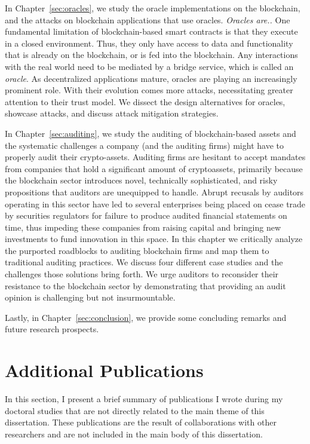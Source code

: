 In Chapter~\ref{sec:oracles}, we study the oracle implementations on the blockchain, and the attacks on blockchain applications that use oracles. \textit{Oracles are.. } One fundamental limitation of blockchain-based smart contracts is that they execute in a closed environment. Thus, they only have access to data and functionality that is already on the blockchain, or is fed into the blockchain. Any interactions with the real world need to be mediated by a bridge service, which is called an \textit{oracle}. As decentralized applications mature, oracles are playing an increasingly prominent role. With their evolution comes more attacks, necessitating greater attention to their trust model. We dissect the design alternatives for oracles, showcase attacks, and discuss attack mitigation strategies.


In Chapter~\ref{sec:auditing}, we study the auditing of blockchain-based assets and the systematic challenges a company (and the auditing firms) might have to properly audit their crypto-assets. Auditing firms are hesitant to accept mandates from companies that hold a significant amount of cryptoassets, primarily because the blockchain sector introduces novel, technically sophisticated, and risky propositions that auditors are unequipped to handle. Abrupt recusals by auditors operating in this sector have led to several enterprises being placed on cease trade by securities regulators for failure to produce audited financial statements on time, thus impeding these companies from raising capital and bringing new investments to fund innovation in this space. In this chapter we critically analyze the purported roadblocks to auditing blockchain firms and map them to traditional auditing practices. We discuss four different case studies and the challenges those solutions bring forth. We urge auditors to reconsider their resistance to the blockchain sector by demonstrating that providing an audit opinion is challenging but not insurmountable.

Lastly, in Chapter~\ref{sec:conclusion}, we provide some concluding remarks and future research prospects.

\section{Additional Publications}
In this section, I present a brief summary of publications I wrote during my doctoral studies that are not directly related to the main theme of this dissertation. These publications are the result of collaborations with other researchers and are not included in the main body of this dissertation.

